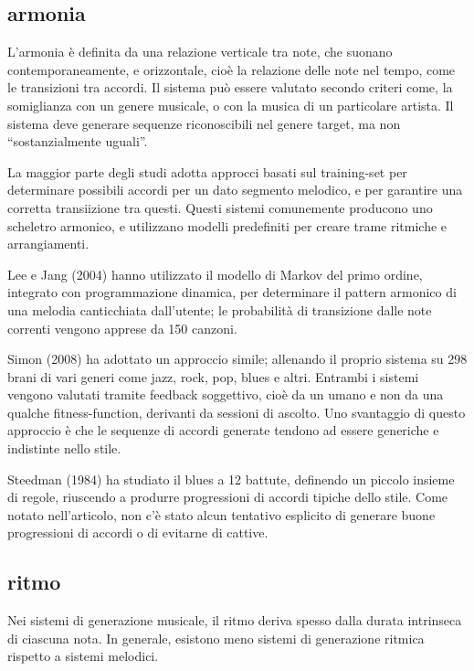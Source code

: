 \documentclass[a4paper,12pt]{report}
\begin{document}
\subsection{armonia}

L'armonia è definita da una relazione verticale tra note, che suonano contemporaneamente, e orizzontale, cioè la relazione delle note nel tempo, come le transizioni tra accordi.
Il sistema può essere valutato secondo criteri come, la somiglianza con un genere musicale, o con la musica di un particolare artista.
Il sistema deve generare sequenze riconoscibili nel genere target, ma non “sostanzialmente uguali”.

La maggior parte degli studi adotta approcci basati sul training-set per determinare possibili accordi per un dato segmento melodico, e per garantire una corretta transiizione tra questi.
Questi sistemi comunemente producono uno scheletro armonico, e utilizzano modelli predefiniti per creare trame ritmiche e arrangiamenti.

Lee e Jang (2004) hanno utilizzato il modello di Markov del primo ordine, integrato con programmazione dinamica, per determinare il pattern armonico di una melodia canticchiata dall'utente; 
le probabilità di transizione dalle note correnti vengono apprese da 150 canzoni. 

Simon (2008) ha adottato un approccio simile; allenando il proprio sistema su 298 brani di vari generi come jazz, rock, pop, blues e altri. 
Entrambi i sistemi vengono valutati tramite feedback soggettivo, cioè da un umano e non da una qualche fitness-function, derivanti da sessioni di ascolto. 
Uno svantaggio di questo approccio è che le sequenze di accordi generate tendono ad essere generiche e indistinte nello stile.

Steedman (1984) ha studiato il blues a 12 battute, definendo un piccolo insieme di regole, riuscendo a produrre progressioni di accordi tipiche dello stile.
Come notato nell'articolo, non c'è stato alcun tentativo esplicito di generare buone progressioni di accordi o di evitarne di cattive. 

\subsection{ritmo}

Nei sistemi di generazione musicale, il ritmo deriva spesso dalla durata intrinseca di ciascuna nota. 
In generale, esistono meno sistemi di generazione ritmica rispetto a sistemi melodici.
\end{document}
